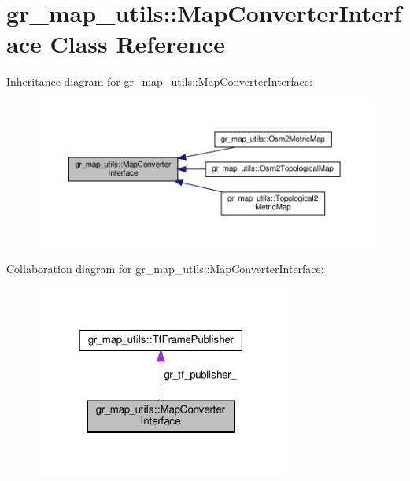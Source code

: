 \hypertarget{classgr__map__utils_1_1MapConverterInterface}{}\section{gr\+\_\+map\+\_\+utils\+:\+:Map\+Converter\+Interface Class Reference}
\label{classgr__map__utils_1_1MapConverterInterface}


Inheritance diagram for gr\+\_\+map\+\_\+utils\+:\+:Map\+Converter\+Interface\+:
\nopagebreak
\begin{figure}[H]
\begin{center}
\leavevmode
\includegraphics[width=350pt]{classgr__map__utils_1_1MapConverterInterface__inherit__graph}
\end{center}
\end{figure}


Collaboration diagram for gr\+\_\+map\+\_\+utils\+:\+:Map\+Converter\+Interface\+:
\nopagebreak
\begin{figure}[H]
\begin{center}
\leavevmode
\includegraphics[width=235pt]{classgr__map__utils_1_1MapConverterInterface__coll__graph}
\end{center}
\end{figure}
